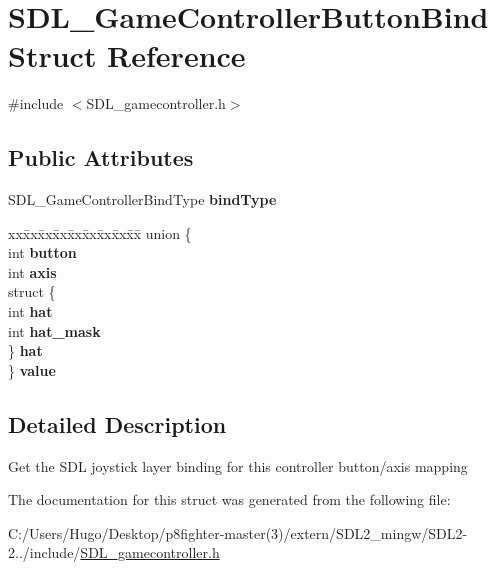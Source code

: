 \hypertarget{struct_s_d_l___game_controller_button_bind}{}\section{S\+D\+L\+\_\+\+Game\+Controller\+Button\+Bind Struct Reference}
\label{struct_s_d_l___game_controller_button_bind}


{\ttfamily \#include $<$S\+D\+L\+\_\+gamecontroller.\+h$>$}

\subsection*{Public Attributes}
\begin{DoxyCompactItemize}
\item 
\mbox{\label{struct_s_d_l___game_controller_button_bind_a032fd941b0e8e5e2cdf52b7597f559b9}} 
S\+D\+L\+\_\+\+Game\+Controller\+Bind\+Type {\bfseries bind\+Type}
\item 
\mbox{\label{struct_s_d_l___game_controller_button_bind_a617787596bd34e89e7619a585cab0c94}} 
\begin{tabbing}
xx\=xx\=xx\=xx\=xx\=xx\=xx\=xx\=xx\=\kill
union \{\\
\>int {\bfseries button}\\
\>int {\bfseries axis}\\
\>struct \{\\
\>\>int {\bfseries hat}\\
\>\>int {\bfseries hat\_mask}\\
\>\} {\bfseries hat}\\
\} {\bfseries value}\\

\end{tabbing}\end{DoxyCompactItemize}


\subsection{Detailed Description}
Get the S\+DL joystick layer binding for this controller button/axis mapping 

The documentation for this struct was generated from the following file\+:\begin{DoxyCompactItemize}
\item 
C\+:/\+Users/\+Hugo/\+Desktop/p8fighter-\/master(3)/extern/\+S\+D\+L2\+\_\+mingw/\+S\+D\+L2-\/2../include/\hyperlink{_s_d_l__gamecontroller_8h}{S\+D\+L\+\_\+gamecontroller.\+h}\end{DoxyCompactItemize}

